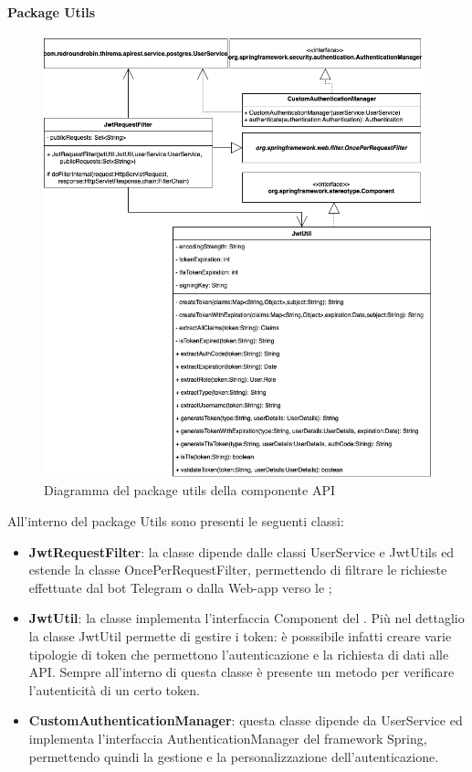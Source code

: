 		\paragraph*{Package Utils}
		\begin{figure}[H]
			\centering
			\includegraphics[scale=0.550]{res/images/API/UtilsPackage.png}
			\caption{Diagramma del package utils della componente API}
			\label{Diagramma 11}
		\end{figure}
		\newpage
		All'interno del package Utils sono presenti le seguenti classi:
		\begin{itemize}
			\item \textbf{JwtRequestFilter}: la classe dipende dalle classi UserService e JwtUtils ed estende la classe OncePerRequestFilter, permettendo di filtrare le richieste effettuate dal bot Telegram o dalla Web-app verso le ;
			\item \textbf{JwtUtil}: la classe implementa l'interfaccia Component del . Più nel dettaglio la classe JwtUtil permette di gestire i token: è posssibile infatti creare varie tipologie di token che permettono l'autenticazione e la richiesta di dati alle API. Sempre all'interno di questa classe è presente un metodo per verificare l'autenticità di un certo token.
			\item \textbf{CustomAuthenticationManager}: questa classe dipende da UserService ed implementa l'interfaccia AuthenticationManager del framework Spring, permettendo quindi la gestione e la personalizzazione dell'autenticazione.
		\end{itemize}
		
